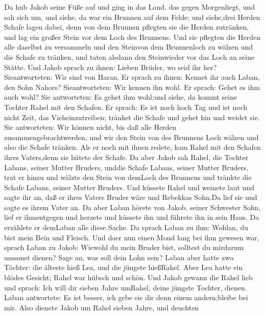  Da hub Jakob seine Füße auf und ging in das Land, das gegen
Morgenliegt,  und sah sich um, und siehe, da war ein Brunnen
auf dem Felde; und siehe,drei Herden Schafe lagen dabei, denn von dem
Brunnen pflegten sie die Herden zutränken, und lag ein großer Stein vor
dem Loch des Brunnens.  Und sie pflegten die Herden alle
daselbst zu versammeln und den Steinvon dem Brunnenloch zu wälzen und
die Schafe zu tränken, und taten alsdann den Steinwieder vor das Loch an
seine Stätte.  Und Jakob sprach zu ihnen: Lieben Brüder, wo
seid ihr her? Sieantworteten: Wir sind von Haran.  Er sprach
zu ihnen: Kennet ihr auch Laban, den Sohn Nahors? Sieantworteten: Wir
kennen ihn wohl.  Er sprach: Gehet es ihm auch wohl? Sie
antworteten: Es gehet ihm wohl;und siehe, da kommt seine Tochter Rahel
mit den Schafen.  Er sprach: Es ist noch hoch Tag und ist
noch nicht Zeit, das Vieheinzutreiben; tränket die Schafe und gehet hin
und weidet sie.  Sie antworteten: Wir können nicht, bis daß
alle Herden zusammengebrachtwerden, und wir den Stein von des Brunnens
Loch wälzen und also die Schafe tränken.  Als er noch mit
ihnen redete, kam Rahel mit den Schafen ihres Vaters,denn sie hütete der
Schafe.  Da aber Jakob sah Rahel, die Tochter Labans,
seiner Mutter Bruders, unddie Schafe Labans, seiner Mutter Bruders, trat
er hinzu und wälzte den Stein von demLoch des Brunnens und tränkte die
Schafe Labans, seiner Mutter Bruders.  Und küssete Rahel
und weinete laut  und sagte ihr an, daß er ihres Vaters
Bruder wäre und Rebekkas Sohn.Da lief sie und sagte es ihrem Vater an.
 Da aber Laban hörete von Jakob, seiner Schwester Sohn,
lief er ihmentgegen und herzete und küssete ihn und führete ihn in sein
Haus. Da erzählete er demLaban alle diese Sache.  Da sprach
Laban zu ihm: Wohlan, du bist mein Bein und Fleisch. Und daer nun einen
Mond lang bei ihm gewesen war,  sprach Laban zu Jakob:
Wiewohl du mein Bruder bist, solltest du mirdarum umsonst dienen? Sage
an, was soll dein Lohn sein?  Laban aber hatte zwo Töchter:
die älteste hieß Lea, und die jüngste hießRahel.  Aber Lea
hatte ein blödes Gesicht; Rahel war hübsch und schön.  Und
Jakob gewann die Rahel lieb und sprach: Ich will dir sieben Jahre
umRahel, deine jüngste Tochter, dienen.  Laban antwortete:
Es ist besser, ich gebe sie dir denn einem andern;bleibe bei mir.
 Also dienete Jakob um Rahel sieben Jahre, und deuchten
